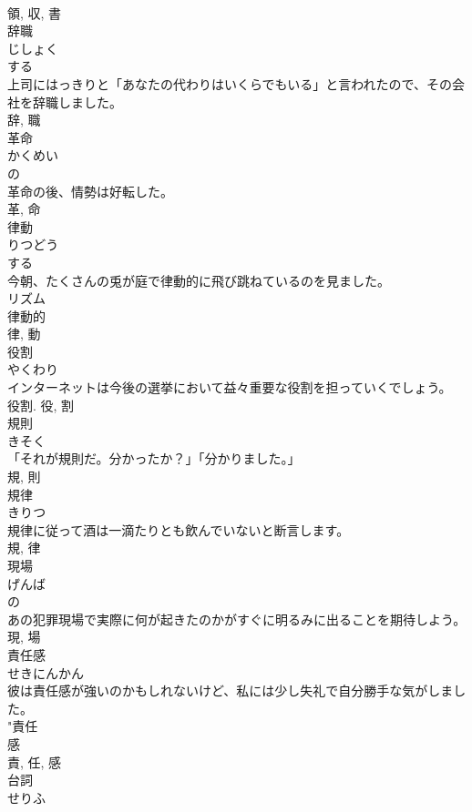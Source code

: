 \documentclass[8pt]{extreport}
\begin{document}
\begin{CJK}{UTF8}{min}
\\	領, 収, 書	
\\	辞職	
\\	じしょく	
\\	する 
\\	上司にはっきりと「あなたの代わりはいくらでもいる」と言われたので、その会社を辞職しました。	
\\	辞, 職	
\\	革命	
\\	かくめい	
\\	の 
\\	革命の後、情勢は好転した。	
\\	革, 命	
\\	律動	
\\	りつどう	
\\	する 
\\	今朝、たくさんの兎が庭で律動的に飛び跳ねているのを見ました。	
\\	リズム 
\\	律動的 
\\	律, 動	
\\	役割	
\\	やくわり	
\\	インターネットは今後の選挙において益々重要な役割を担っていくでしょう。	
\\	役割.	役, 割	
\\	規則	
\\	きそく	
\\	「それが規則だ。分かったか？」「分かりました。」	
\\	規, 則	
\\	規律	
\\	きりつ	
\\	規律に従って酒は一滴たりとも飲んでいないと断言します。	
\\	規, 律	
\\	現場	
\\	げんば	
\\	の 
\\	あの犯罪現場で実際に何が起きたのかがすぐに明るみに出ることを期待しよう。	
\\	現, 場	
\\	責任感	
\\	せきにんかん	
\\	彼は責任感が強いのかもしれないけど、私には少し失礼で自分勝手な気がしました。	
\\	"責任 
\\	感 
\\	責, 任, 感	
\\	台詞	
\\	せりふ	

\end{CJK}
\end{document}
